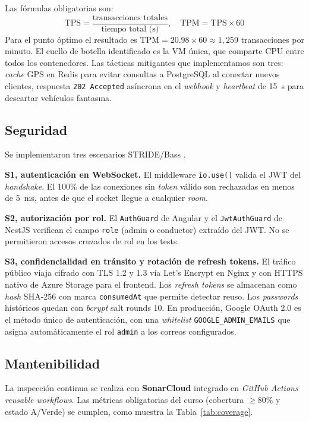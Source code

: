 \documentclass[conference]{IEEEtran}
\begin{document}
Las f\'ormulas obligatorias son:
\begin{equation}
\text{TPS} = \frac{\text{transacciones totales}}{\text{tiempo total (s)}}, \quad
\text{TPM} = \text{TPS} \times 60
\end{equation}
Para el punto \'optimo el resultado es $\text{TPM} = 20.98 \times 60 \approx 1{,}259$ transacciones por minuto. El cuello de botella identificado es la VM \'unica, que comparte CPU entre todos los contenedores. Las t\'acticas mitigantes que implementamos son tres: \emph{cache} GPS en Redis para evitar consultas a PostgreSQL al conectar nuevos clientes, respuesta \texttt{202 Accepted} as\'incrona en el \emph{webhook} y \emph{heartbeat} de 15~s para descartar veh\'iculos fantasma.

\subsection{Seguridad}

Se implementaron tres escenarios STRIDE/Bass \cite{bass2021}.

\textbf{S1, autenticaci\'on en WebSocket.} El middleware \texttt{io.use()} valida el JWT del \emph{handshake}. El 100\% de las conexiones sin \emph{token} v\'alido son rechazadas en menos de 5~ms, antes de que el socket llegue a cualquier \emph{room}.

\textbf{S2, autorizaci\'on por rol.} El \texttt{AuthGuard} de Angular y el \texttt{JwtAuthGuard} de NestJS verifican el campo \texttt{role} (admin o conductor) extra\'ido del JWT. No se permitieron accesos cruzados de rol en los tests.

\textbf{S3, confidencialidad en tr\'ansito y rotaci\'on de refresh tokens.} El tr\'afico p\'ublico viaja cifrado con TLS 1.2 y 1.3 v\'ia Let's Encrypt en Nginx y con HTTPS nativo de Azure Storage para el frontend. Los \emph{refresh tokens} se almacenan como \emph{hash} SHA-256 con marca \texttt{consumedAt} que permite detectar reuso. Los \emph{passwords} hist\'oricos quedan con \emph{bcrypt} salt rounds 10. En producci\'on, Google OAuth 2.0 \cite{rfc6749} es el m\'etodo \'unico de autenticaci\'on, con una \emph{whitelist} \texttt{GOOGLE\_ADMIN\_EMAILS} que asigna autom\'aticamente el rol \texttt{admin} a los correos configurados.

\subsection{Mantenibilidad}

La inspecci\'on continua se realiza con \textbf{SonarCloud} \cite{sonar} integrado en \emph{GitHub Actions reusable workflows}. Las m\'etricas obligatorias del curso (cobertura $\geq 80\%$ y estado A/Verde) se cumplen, como muestra la Tabla~\ref{tab:coverage}.
\end{document}
